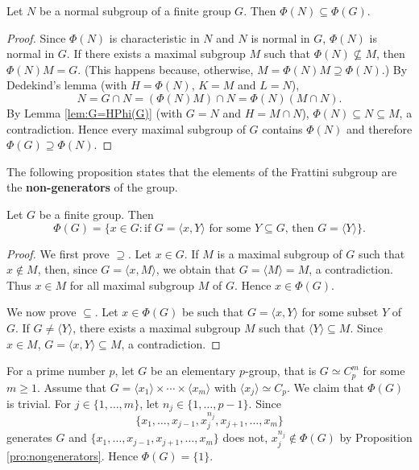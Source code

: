 \begin{proposition}
\label{pro:phi(N)phi(G)}
Let $N$ be a normal subgroup of a finite group $G$. Then 
$\Phi(N)\subseteq\Phi(G)$.
\end{proposition}

\begin{proof}
Since $\Phi(N)$ is characteristic in $N$ and $N$ 
is normal in $G$, $\Phi(N)$ is normal in $G$. 
If there exists a maximal subgroup $M$ such that 
$\Phi(N)\not\subseteq M$, then $\Phi(N)M=G$. (This happens
because, otherwise, $M=\Phi(N)M\supseteq\Phi(N)$.) By Dedekind's lemma (with  $H=\Phi(N)$, $K=M$ and $L=N$), 
\[
N=G\cap N=(\Phi(N)M)\cap N=\Phi(N)(M\cap N).
\]
By Lemma \ref{lem:G=HPhi(G)} (with $G=N$ and $H=M\cap N$), 
$\Phi(N)\subseteq N\subseteq M$, a contradiction. 
Hence every maximal subgroup of $G$ contains $\Phi(N)$ and therefore 
$\Phi(G)\supseteq\Phi(N)$. 
\end{proof}

The following proposition states that the 
elements of the Frattini subgroup are the \textbf{non-generators} of 
the group. 

\begin{proposition}
	\label{pro:nongenerators}
	Let $G$ be a finite group. Then 
 	\[
	\Phi(G)=\{x\in G:\text{if $G=\langle x,Y\rangle$ for some $Y\subseteq G$, then $G=\langle Y\rangle$}\}.
	\]
\end{proposition}

\begin{proof}
We first prove $\supseteq$. Let $x\in G$. If $M$ is a maximal subgroup of $G$ such that $x\not\in M$, then, since $G=\langle
	x,M\rangle$, we obtain that $G=\langle M\rangle=M$, a contradiction. Thus $x\in M$ for all maximal subgroup $M$ of $G$. Hence 
 $x\in \Phi(G)$. 

We now prove $\subseteq$. Let $x\in\Phi(G)$ be such that $G=\langle
	x,Y\rangle$ for some subset $Y$ of $G$. If $G\ne \langle Y\rangle$,
	there exists a maximal subgroup $M$ such that $\langle Y\rangle\subseteq M$. Since
	$x\in M$, $G=\langle x,Y\rangle\subseteq M$, a contradiction. 
\end{proof}

\begin{example}
For a prime number $p$, let $G$ be an elementary $p$-group, that is 
$G\simeq C_p^m$ for some $m\geq1$. Assume that 
	$G=\langle x_1\rangle\times\cdots\times\langle x_m\rangle$ with $\langle x_j\rangle\simeq C_p$.  
	We claim that $\Phi(G)$ is trivial. 
	For $j\in\{1,\dots,m\}$, let $n_j\in\{1,\dots,p-1\}$. Since 
	\[
	\{x_1,\dots,x_{j-1},x_j^{n_j},x_{j+1},\dots,x_m\}
	\]
	generates $G$ and $\{x_1,\dots,x_{j-1},x_{j+1},\dots,x_m\}$ does not, 
	$x_j^{n_j}\not\in\Phi(G)$ by Proposition \ref{pro:nongenerators}. 
	Hence $\Phi(G)=\{1\}$.
\end{example}

